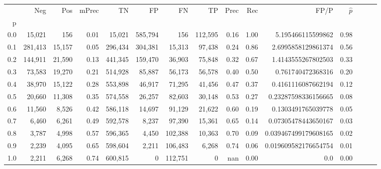 \begin{tabular}{rrrrrrrrrrrrrrr}
\toprule
{} &      Neg &     Pos & mPrec &       TN &       FP &       FN &       TP &  Prec &   Rec &                  FP/P & $\hat{p}$ \\
p   &          &         &       &          &          &          &          &       &       &                       &           \\
\midrule
0.0 &   15,021 &     156 &  0.01 &   15,021 &  585,794 &      156 &  112,595 &  0.16 &  1.00 &     5.195466115599862 &      0.98 \\
0.1 &  281,413 &  15,157 &  0.05 &  296,434 &  304,381 &   15,313 &   97,438 &  0.24 &  0.86 &    2.6995858129861374 &      0.56 \\
0.2 &  144,911 &  21,590 &  0.13 &  441,345 &  159,470 &   36,903 &   75,848 &  0.32 &  0.67 &    1.4143555267802503 &      0.33 \\
0.3 &   73,583 &  19,270 &  0.21 &  514,928 &   85,887 &   56,173 &   56,578 &  0.40 &  0.50 &     0.761740472368316 &      0.20 \\
0.4 &   38,970 &  15,122 &  0.28 &  553,898 &   46,917 &   71,295 &   41,456 &  0.47 &  0.37 &    0.4161116087662194 &      0.12 \\
0.5 &   20,660 &  11,308 &  0.35 &  574,558 &   26,257 &   82,603 &   30,148 &  0.53 &  0.27 &   0.23287598336156665 &      0.08 \\
0.6 &   11,560 &   8,526 &  0.42 &  586,118 &   14,697 &   91,129 &   21,622 &  0.60 &  0.19 &    0.1303491765039778 &      0.05 \\
0.7 &    6,460 &   6,261 &  0.49 &  592,578 &    8,237 &   97,390 &   15,361 &  0.65 &  0.14 &   0.07305478443650167 &      0.03 \\
0.8 &    3,787 &   4,998 &  0.57 &  596,365 &    4,450 &  102,388 &   10,363 &  0.70 &  0.09 &  0.039467499179608165 &      0.02 \\
0.9 &    2,239 &   4,095 &  0.65 &  598,604 &    2,211 &  106,483 &    6,268 &  0.74 &  0.06 &  0.019609582176654754 &      0.01 \\
1.0 &    2,211 &   6,268 &  0.74 &  600,815 &        0 &  112,751 &        0 &   nan &  0.00 &                   0.0 &      0.00 \\
\bottomrule
\end{tabular}
